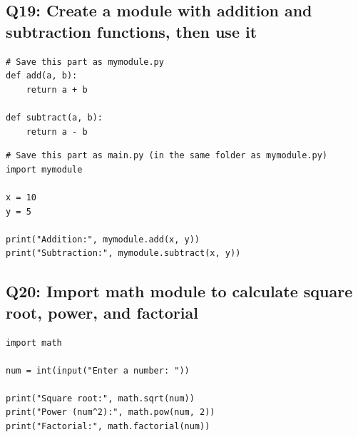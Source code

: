 \documentclass[11pt,a4paper]{article}
\begin{document}
\subsection{Q19: Create a module with addition and subtraction functions, then use it}
\begin{lstlisting}
# Save this part as mymodule.py
def add(a, b):
    return a + b

def subtract(a, b):
    return a - b
\end{lstlisting}

\begin{lstlisting}
# Save this part as main.py (in the same folder as mymodule.py)
import mymodule

x = 10
y = 5

print("Addition:", mymodule.add(x, y))
print("Subtraction:", mymodule.subtract(x, y))
\end{lstlisting}

\subsection{Q20: Import math module to calculate square root, power, and factorial}
\begin{lstlisting}
import math

num = int(input("Enter a number: "))

print("Square root:", math.sqrt(num))
print("Power (num^2):", math.pow(num, 2))
print("Factorial:", math.factorial(num))
\end{lstlisting}
\end{document}
